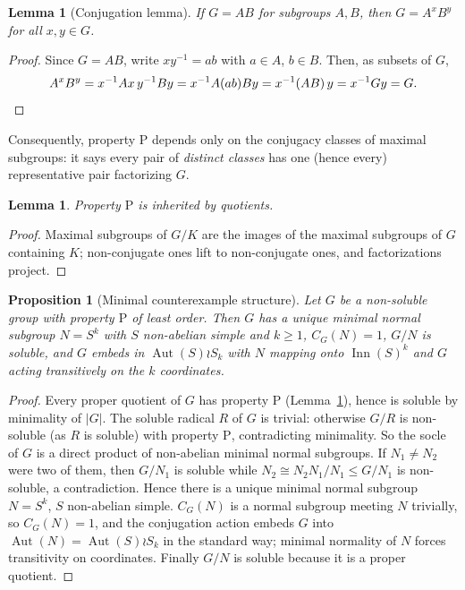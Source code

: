 \documentclass[11pt]{amsart}
\newtheorem{lemma}[theorem]{Lemma}
\newtheorem{proposition}[theorem]{Proposition}
\theoremstyle{definition}
\theoremstyle{remark}
\DeclareMathOperator{\Inn}{Inn}
\DeclareMathOperator{\Aut}{Aut}
\begin{document}
\begin{lemma}[Conjugation lemma]\label{lem:conj}
If $G=AB$ for subgroups $A,B$, then $G=A^xB^y$ for all $x,y\in G$.
\end{lemma}

\begin{proof}
Since $G=AB$, write $xy^{-1}=ab$ with $a\in A$, $b\in B$. Then, as
subsets of $G$,
\[
A^xB^y=x^{-1}Ax\,y^{-1}By=x^{-1}A(ab)By
 =x^{-1}(AB)\,y=x^{-1}Gy=G. \qedhere
\]
\end{proof}

Consequently, property $\mathrm{P}$ depends only on the conjugacy classes
of maximal subgroups: it says every pair of \emph{distinct classes} has
one (hence every) representative pair factorizing $G$.

\begin{lemma}\label{lem:quot}
Property $\mathrm{P}$ is inherited by quotients.
\end{lemma}

\begin{proof}
Maximal subgroups of $G/K$ are the images of the maximal subgroups of $G$
containing $K$; non-conjugate ones lift to non-conjugate ones, and
factorizations project.
\end{proof}

\begin{proposition}[Minimal counterexample structure]\label{prop:min}
Let $G$ be a non-soluble group with property $\mathrm{P}$ of least order.
Then $G$ has a unique minimal normal subgroup $N=S^k$ with $S$ non-abelian
simple and $k\geq 1$, $C_G(N)=1$, $G/N$ is soluble, and $G$ embeds in
$\Aut(S)\wr S_k$ with $N$ mapping onto $\Inn(S)^k$ and $G$ acting
transitively on the $k$ coordinates.
\end{proposition}

\begin{proof}
Every proper quotient of $G$ has property $\mathrm{P}$
(Lemma~\ref{lem:quot}), hence is soluble by minimality of $|G|$. The
soluble radical $R$ of $G$ is trivial: otherwise $G/R$ is non-soluble
(as $R$ is soluble) with property $\mathrm{P}$, contradicting minimality.
So the socle of $G$ is a direct product of non-abelian minimal normal
subgroups. If $N_1\neq N_2$ were two of them, then $G/N_1$ is soluble
while $N_2\cong N_2N_1/N_1\leq G/N_1$ is non-soluble, a contradiction.
Hence there is a unique minimal normal subgroup $N=S^k$, $S$ non-abelian
simple. $C_G(N)$ is a normal subgroup meeting $N$ trivially, so
$C_G(N)=1$, and the conjugation action embeds $G$ into $\Aut(N)=
\Aut(S)\wr S_k$ in the standard way; minimal normality of $N$ forces
transitivity on coordinates. Finally $G/N$ is soluble because it is a
proper quotient.
\end{proof}
\end{document}
